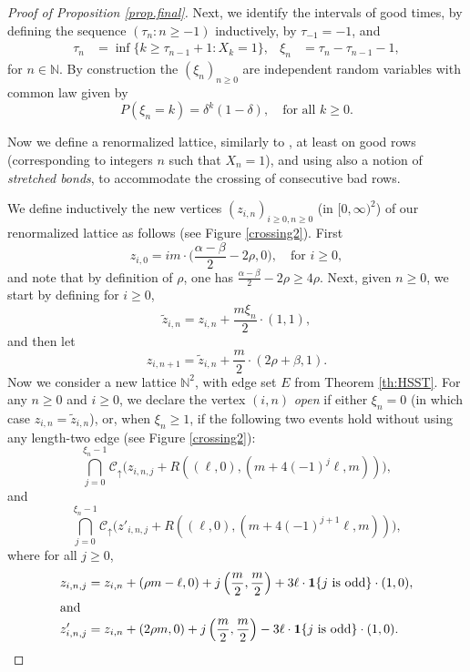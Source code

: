 \documentclass[pdflatex,sn-mathphys-num]{sn-jnl}%
\newcommand{\cC}{\ensuremath{\mathcal C}}
\newcommand{\bbN}{{\ensuremath{\mathbb N}} }
\newcommand{\1}{{\ensuremath{\mathbf{1}}} }
\theoremstyle{thmstyleone}%
\theoremstyle{thmstyletwo}%
\theoremstyle{thmstylethree}%
\begin{document}
\begin{proof}[Proof of Proposition \ref{prop.final}]
Next, we identify the intervals of good times, by defining the sequence $(\tau_n:n\ge -1)$ inductively, by $\tau_{-1} = -1$, and  
\begin{align*}
\tau_{n} &{}= \inf \{k\ge \tau_{n-1} + 1 : X_k = 1\},
&\xi_n  &{}= \tau_n - \tau_{n-1} - 1,
\end{align*}
for $n\in\bbN$. By construction the $(\xi_n)_{n\ge 0}$ are independent random variables with common law given by  
\begin{equation}\label{law.xin}
P(\xi_n = k) = \delta^k (1-\delta), \quad \text{for all }k\ge 0.
\end{equation}

Now we define a renormalized lattice, similarly to \cite[Section 9]{Durrett84}, at least on good rows (corresponding to integers $n$ such that $X_n = 1$), and using also a notion of {\it stretched bonds}, to accommodate the crossing of consecutive bad rows.

We define inductively the new vertices $(z_{i,n})_{i\ge 0, n\ge 0 }$ (in $[0,\infty)^2$) of our renormalized lattice as follows (see Figure \ref{crossing2}).
First 
$$z_{i,0} = im\cdot \big(\frac{\alpha-\beta}{2} - 2\rho,0\big),\quad \text{for }i\ge 0,$$
and note that by definition of $\rho$, one has $\tfrac{\alpha-\beta}{2} - 2\rho\ge 4 \rho$. 
Next, given $n\ge 0$, we start by defining for $i\ge 0$, 
$$\widetilde z_{i,n} = z_{i,n} + \frac {m\xi_n} 2 \cdot (1,1),$$  
and then let
\begin{equation}\label{zn+1i}
z_{i,n+1} =  \widetilde z_{i,n} + \frac m2 \cdot (2\rho +  \beta,1 ).  
\end{equation}
Now we consider a new lattice $\mathbb N^2$, with edge set $E$ from Theorem \ref{th:HSST}. 
For any $n\ge 0$ and $i\ge 0$, we declare the vertex $(i,n)$ \textit{open} if either $\xi_n = 0$ (in which case $z_{i,n} = \widetilde z_{i,n}$), or, when $\xi_n\ge 1$, if the following two events hold without using any length-two edge (see Figure \ref{crossing2}):  
\begin{equation}\label{open.v.1}
\bigcap_{j=0}^{\xi_n-1}  \cC_\uparrow\big(z_{i,n,j}  + R((\ell,0),(m+4(-1)^j \ell,m)) \big),
\end{equation} 
and 
\begin{equation}\label{open.v.2}
\bigcap_{j=0}^{\xi_n-1}  \cC_\uparrow\big(z'_{i,n,j}  + R((\ell,0),(m+4(-1)^{j+1} \ell,m)) \big),
\end{equation} 
where for all $j\ge 0$, 
\begin{align*}
z_{i,n,j} &{}= z_{i,n} + (\rho m - \ell,0) + j\left(\frac m2, \frac m2\right) +3\ell \cdot  \1\{j \text{ is odd}\} \cdot (1,0),\\
\intertext{and}
z'_{i,n,j} &{}= z_{i,n} + (2\rho m,0) + j\left(\frac m2, \frac m2\right) -3\ell \cdot  \1\{j \text{ is odd}\} \cdot (1,0).
\end{align*}


\end{proof}
\end{document}
